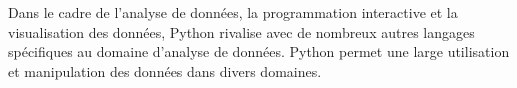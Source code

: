\documentclass[a4paper]{report}
\begin{document}
    
    
    
%    
    
Dans le cadre de l'analyse de données, la programmation interactive et la visualisation des données, Python rivalise avec de nombreux autres langages spécifiques au domaine d'analyse de données. Python permet une large utilisation et manipulation des données dans divers domaines.\\
\end{document}
